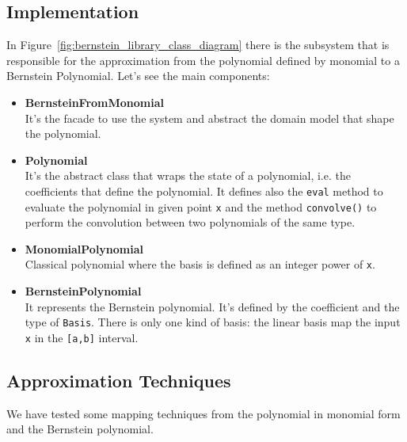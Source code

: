 \subsection{Implementation}
In Figure~\ref{fig:bernstein_library_class_diagram} there is the subsystem that is responsible for the approximation from the polynomial defined by monomial to a Bernstein Polynomial. Let's see the main components:
\begin{itemize}
    \item \textbf{BernsteinFromMonomial} \\
        It's the facade to use the system and abstract the domain model that shape the polynomial.
    \item \textbf{Polynomial} \\
        It's the abstract class that wraps the state of a polynomial, i.e. the coefficients that define the polynomial. It defines also the \texttt{eval} method to evaluate the polynomial in given point \texttt{x} and the method \texttt{convolve()} to perform the convolution between two polynomials of the same type.
    \item \textbf{MonomialPolynomial} \\
        Classical polynomial where the basis is defined as an integer power of \texttt{x}.
    \item \textbf{BernsteinPolynomial} \\
        It represents the Bernstein polynomial. It's defined by the coefficient and the type of \texttt{Basis}. There is only one kind of basis: the linear basis map the input \texttt{x} in the \texttt{[a,b]} interval.
\end{itemize}

\subsection{Approximation Techniques}
We have tested some mapping techniques from the polynomial in monomial form and the Bernstein polynomial.

